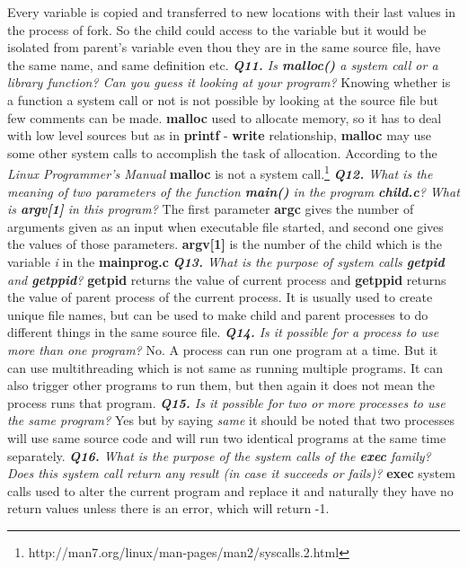 \documentclass[11pt]{article}
\begin{document}
Every variable is copied and transferred to new locations with their last values in the process of fork. So the child could access to the variable but it would be isolated from parent's variable even thou they are in the same source file, have the same name, and same definition etc.
\vspace{5mm}
\textit{\textbf{Q11.} Is \textbf{malloc()} a system call or a library function? Can you guess it looking at your program?}
\vspace{5mm}
Knowing whether is a function a system call or not is not possible by looking at the source file but few comments can be made.
\textbf{malloc} used to allocate memory, so it has to deal with low level sources but as in \textbf{printf} - \textbf{write} relationship, \textbf{malloc} may use some other system calls to accomplish the task of allocation.
According to the \textit{Linux Programmer's Manual} \textbf{malloc} is not a system call.\footnote{http://man7.org/linux/man-pages/man2/syscalls.2.html}
\vspace{5mm}
\textit{\textbf{Q12.} What is the meaning of two parameters of the function \textbf{main()} in the program \textbf{child.c}? What is \textbf{argv[1]} in this program?}
\vspace{5mm}
The first parameter \textbf{argc} gives the number of arguments given as an input when executable file started, and second one gives the values of those parameters. 
\textbf{argv[1]} is the number of the child which is the variable \textit{i} in the \textbf{mainprog.c}
\vspace{5mm}
\textit{\textbf{Q13.} What is the purpose of system calls \textbf{getpid} and \textbf{getppid}?}
\vspace{5mm}
 \textbf{getpid} returns the value of current process and  \textbf{getppid} returns the value of parent process of the current process. It is usually used to create unique file names, but can be used to make child and parent processes to do different things in the same source file.
\vspace{5mm}
\textit{\textbf{Q14.} Is it possible for a process to use more than one program?}
\vspace{5mm}
No. A process can run one program at a time. But it can use multithreading which is not same as running multiple programs. It can also trigger other programs to run them, but then again it does not mean the process runs that program.
\newpage
\vspace{5mm}
\textit{\textbf{Q15.} Is it possible for two or more processes to use the same program?}
\vspace{5mm}
Yes but by saying \textit{same} it should be noted that two processes will use same source code and will run two identical programs at the same time separately.
\vspace{5mm}
\textit{\textbf{Q16.} What is the purpose of the system calls of the \textbf{exec} family? Does this system call return any result (in case it succeeds or fails)?}
\vspace{5mm}
\textbf{exec} system calls used to alter the current program and replace it and naturally they have no return values unless there is an error, which will return -1.
\end{document}
